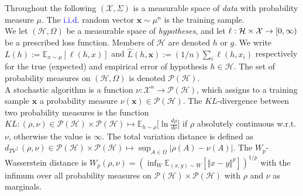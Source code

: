 \documentclass{article} %
\newcommand{\EM}[1]{\textcolor{blue}{#1}}
\begin{document}
Throughout the following $\left( \mathcal{X},\Sigma \right) $ is a
measurable space of \textit{data} with probability measure $\mu $. The \EM{i.i.d.} random vector $\mathbf{x}\sim \mu ^{n}$ is the training sample. \\ We let $\left( \mathcal{H},\Omega \right) $ be a measurable space of \textit{%
hypotheses}, and let $\ell :\mathcal{%
H\times X}\rightarrow \left[ 0,\infty \right)$ be a prescribed 
loss function. Members of $\mathcal{H}$
are denoted $h$ or $g$. We write $L\left( h\right) :=\mathbb{E}_{x\sim \mu }%
\left[ \ell \left( h,x\right) \right] $ and $\hat{L}\left( h,\mathbf{x}%
\right) :=\left( 1/n\right) \sum_{i}\ell \left( h,x_{i}\right) $
respectively for the true (expected) and empirical error of hypothesis $h\in 
\mathcal{H}$. The set of probability measures on $\left( \mathcal{H},\Omega \right) $ is
denoted $\mathcal{P}\left( \mathcal{H}\right) $. \\ A stochastic algorithm is a
function $\nu :\mathcal{X}^{n}\rightarrow \mathcal{P}\left( \mathcal{H}%
\right) $, which assigns to a training sample $\mathbf{x}$ a probability
measure $\nu \left( \mathbf{x}\right) \in \mathcal{P}\left( \mathcal{H}%
\right) $. The $KL$-divergence between two probability measures is the
function $KL:(\rho,\nu)\in \mathcal{P}( \mathcal{H})\times \mathcal{P}(\mathcal{H})\mapsto \mathbb{E}
_{h\sim \rho}\big[ \ln \frac{d\rho }{d\nu }\big] $ if $\rho $ absolutely
continuous w.r.t. $\nu $, otherwise the value is $\infty $. The total
variation distance is defined as $d_{TV}:( \rho,\nu) \in 
\mathcal{P}(\mathcal{H}) \times \mathcal{P}(\mathcal{H})\mapsto \sup_{A\in \Omega }\vert \rho(A) -\nu(A)\vert$. The $W_{p}$-Wasserstein distance is $
W_{p}(\rho,\nu) =( \inf_{W}\mathbb{E}_{(x,y)
\sim W}[\Vert x-y\Vert^{p}]) ^{1/p}$ with the
infimum over all probability measures on $\mathcal{P}( \mathcal{H}) \times \mathcal{P}( \mathcal{H}) $ with $\rho $ and $\nu $
as marginals.
\end{document}
